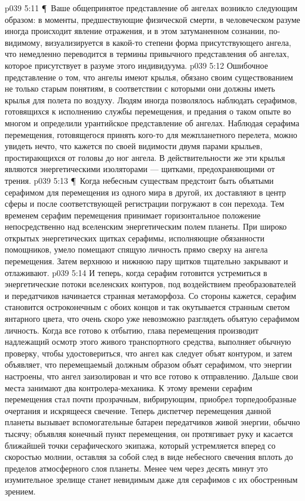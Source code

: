 \vs p039 5:11 \P\ Ваше общепринятое представление об ангелах возникло следующим образом: в моменты, предшествующие физической смерти, в человеческом разуме иногда происходит явление отражения, и в этом затуманенном сознании, по\hyp{}видимому, визуализируется в какой\hyp{}то степени форма присутствующего ангела, что немедленно переводится в термины привычного представления об ангелах, которое присутствует в разуме этого индивидуума.
\vs p039 5:12 Ошибочное представление о том, что ангелы имеют крылья, обязано своим существованием не только старым понятиям, в соответствии с которыми они должны иметь крылья для полета по воздуху. Людям иногда позволялось наблюдать серафимов, готовящихся к исполнению службы перемещения, и предания о таком опыте во многом и определили урантийское представление об ангелах. Наблюдая серафима перемещения, готовящегося принять кого\hyp{}то для межпланетного перелета, можно увидеть нечто, что кажется по своей видимости двумя парами крыльев, простирающихся от головы до ног ангела. В действительности же эти крылья являются энергетическими изоляторами --- щитками, предохраняющими от трения.
\vs p039 5:13 \P\ Когда небесным существам предстоит быть объятыми серафимом для перемещения из одного мира в другой, их доставляют в центр сферы и после соответствующей регистрации погружают в сон перехода. Тем временем серафим перемещения принимает горизонтальное положение непосредственно над вселенским энергетическим полем планеты. При широко открытых энергетических щитках серафимы, исполняющие обязанности помощников, умело помещают спящую личность прямо сверху на ангела перемещения. Затем верхнюю и нижнюю пару щитков тщательно закрывают и отлаживают.
\vs p039 5:14 И теперь, когда серафим готовится устремиться в энергетические потоки вселенских контуров, под воздействием преобразователей и передатчиков начинается странная метаморфоза. Со стороны кажется, серафим становится остроконечным с обоих концов и так окутывается странным светом янтарного цвета, что очень скоро уже невозможно разглядеть объятую серафимом личность. Когда все готово к отбытию, глава перемещения производит надлежащий осмотр этого живого транспортного средства, выполняет обычную проверку, чтобы удостовериться, что ангел как следует объят контуром, и затем объявляет, что перемещаемый должным образом объят серафимом, что энергии настроены, что ангел заизолирован и что все готово к отправлению. Дальше свои места занимают два контролера\hyp{}механика. К этому времени серафим перемещения стал почти прозрачным, вибрирующим, приобрел торпедообразные очертания и искрящееся свечение. Теперь диспетчер перемещения данной планеты вызывает вспомогательные батареи передатчиков живой энергии, обычно тысячу; объявляя конечный пункт перемещения, он протягивает руку и касается ближайшей точки серафического экипажа, который устремляется вперед со скоростью молнии, оставляя за собой след в виде небесного свечения вплоть до пределов атмосферного слоя планеты. Менее чем через десять минут это изумительное зрелище станет невидимым даже для серафимов с их обостренным зрением.
